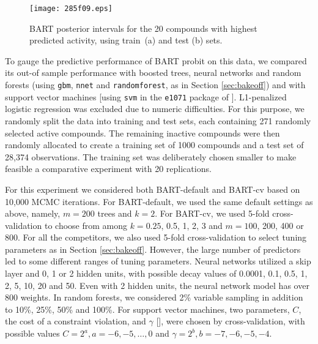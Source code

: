 \documentclass[aoas,nameyear,dvips]{arximspdf}
\newcommand{\citeasnoun}[1]{\citet{#1}}
\begin{document}
\begin{figure}

\texttt{[image: 285f09.eps]}

\caption{BART posterior intervals for the 20 compounds with highest
predicted activity, using train~\textup{(a)} and test \textup{(b)} sets.}\label{intervals}
\end{figure}


To gauge the predictive performance of BART probit on this data, we
compared its out-of sample performance with  boosted trees, neural
networks and random forests (using \texttt{gbm}, \texttt{nnet} and
\texttt{randomforest}, as in Section \ref{sec:bakeoff}) and with
support vector machines [using \texttt{svm} in the \texttt{e1071}
package of \citeasnoun{e1071}].  L1-penalized logistic regression was
excluded due to numeric difficulties.   For this purpose, we randomly
split the data into training and test sets, each containing 271
randomly selected active compounds.  The remaining inactive compounds
were then randomly allocated to create a training set of 1000 compounds
and a test set of 28,374 observations.  The training set was
deliberately chosen smaller to make feasible a comparative experiment
with 20 replications.

For this experiment we considered both BART-default and BART-cv based
on 10,000 MCMC iterations.  For BART-default, we used the same default
settings as above, namely, $m=200$ trees and $k=2$.  For BART-cv, we
used 5-fold cross-validation to choose from among $k=0.25$, 0.5, 1, 2,
3 and $m = 100$, 200, 400 or 800.  For all the competitors, we also
used 5-fold cross-validation to select tuning parameters as in Section
\ref{sec:bakeoff}.  However, the large number of predictors led to some
different ranges of tuning parameters.   Neural networks utilized a
skip layer and 0, 1 or 2 hidden units, with possible decay values of
0.0001, 0.1, 0.5, 1, 2, 5, 10, 20 and 50.  Even with 2 hidden units,
the neural network model has over 800 weights.  In random forests, we
considered 2\% variable sampling in addition to 10\%, 25\%, 50\% and
100\%. For support vector machines, two parameters, $C$, the cost of a
constraint violation, and $\gamma$ [\citet{CC01a}], were chosen by
cross-validation, with possible values $C=2^a, a=-6, -5, \ldots, 0$ and
$\gamma = 2^b, b=-7, -6, -5, -4$.
\end{document}
